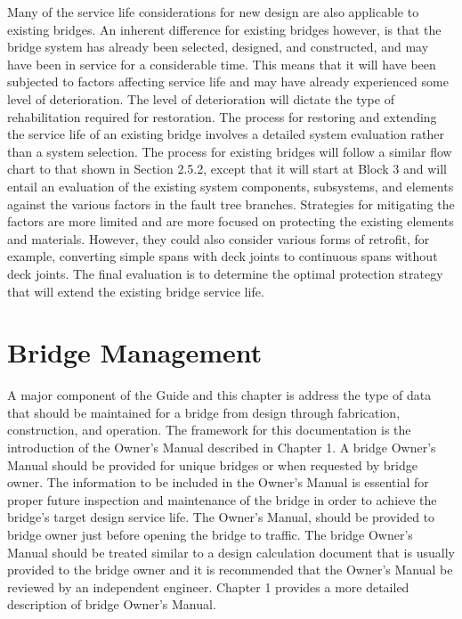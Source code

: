 Many of the service life considerations for new design are also applicable to existing bridges. An inherent
difference for existing bridges however, is that the bridge system has already been selected, designed, and
constructed, and may have been in service for a considerable time. This means that it will have been subjected to
factors affecting service life and may have already experienced some level of deterioration. The level of
deterioration will dictate the type of rehabilitation required for restoration. The process for restoring and extending
the service life of an existing bridge involves a detailed system evaluation rather than a system selection. The process
for existing bridges will follow a similar flow chart to that shown in Section 2.5.2, except that it will start at Block 3
and will entail an evaluation of the existing system components, subsystems, and elements against the various factors
in the fault tree branches. Strategies for mitigating the factors are more limited and are more focused on protecting
the existing elements and materials. However, they could also consider various forms of retrofit, for example,
converting simple spans with deck joints to continuous spans without deck joints. The final evaluation is to
determine the optimal protection strategy that will extend the existing bridge service life.

\section{Bridge Management}

A major component of the Guide and this chapter is address the type of data that should be maintained for a
bridge from design through fabrication, construction, and operation. The framework for this documentation is the
introduction of the Owner's Manual described in Chapter 1. A bridge Owner's Manual should be provided for unique
bridges or when requested by bridge owner. The information to be included in the Owner's Manual is essential for
proper future inspection and maintenance of the bridge in order to achieve the bridge's target design service life. The
Owner's Manual, should be provided to bridge owner just before opening the bridge to traffic. The bridge Owner's
Manual should be treated similar to a design calculation document that is usually provided to the bridge owner and it is recommended that the Owner's Manual be reviewed by an independent engineer. Chapter 1 provides a more
detailed description of bridge Owner's Manual.

